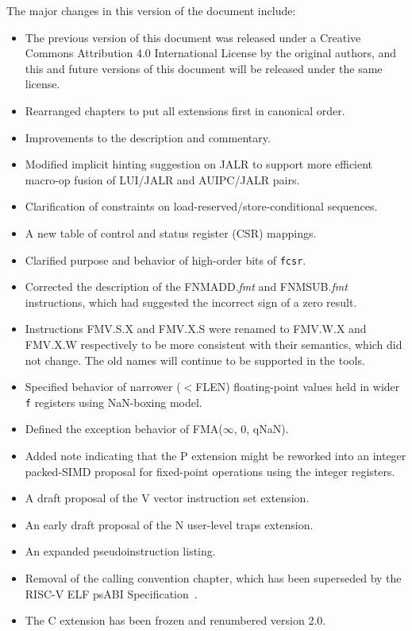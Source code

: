 The major changes in this version of the document include:
\begin{itemize}
\parskip 0pt
\itemsep 1pt
\item The previous version of this document was released under a
  Creative Commons Attribution 4.0 International License by the
  original authors, and this and future versions of this document will
  be released under the same license.
\item Rearranged chapters to put all extensions first in canonical order.
\item Improvements to the description and commentary.
\item Modified implicit hinting suggestion on JALR to support more efficient
  macro-op fusion of LUI/JALR and AUIPC/JALR pairs.
\item Clarification of constraints on load-reserved/store-conditional sequences.
\item A new table of control and status register (CSR) mappings.
\item Clarified purpose and behavior of high-order bits of {\tt fcsr}.
\item Corrected the description of the FNMADD.{\em fmt} and FNMSUB.{\em fmt}
      instructions, which had suggested the incorrect sign of a zero result.
\item Instructions FMV.S.X and FMV.X.S were renamed to FMV.W.X and
  FMV.X.W respectively to be more consistent with their
  semantics, which did not change.
  The old names will continue to be supported in the tools.
\item Specified behavior of narrower ($<$FLEN) floating-point values held in
  wider {\tt f} registers using NaN-boxing model.
\item Defined the exception behavior of FMA($\infty$, 0, qNaN).
\item Added note indicating that the P extension might be reworked
  into an integer packed-SIMD proposal for fixed-point operations
  using the integer registers.
\item A draft proposal of the V vector instruction set extension.
\item An early draft proposal of the N user-level traps extension.
\item An expanded pseudoinstruction listing.
\item Removal of the calling convention chapter, which has been superseded by
      the RISC-V ELF psABI Specification~\cite{riscv-elf-psabi}.
\item The C extension has been frozen and renumbered version 2.0.
\end{itemize}

